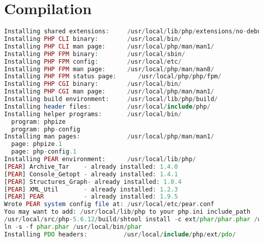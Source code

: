 \chapter{Compilation}

\begin{lstlisting}[language=PHP]
Installing shared extensions:     /usr/local/lib/php/extensions/no-debug-non-zts-20131226/
Installing PHP CLI binary:        /usr/local/bin/
Installing PHP CLI man page:      /usr/local/php/man/man1/
Installing PHP FPM binary:        /usr/local/sbin/
Installing PHP FPM config:        /usr/local/etc/
Installing PHP FPM man page:      /usr/local/php/man/man8/
Installing PHP FPM status page:      /usr/local/php/php/fpm/
Installing PHP CGI binary:        /usr/local/bin/
Installing PHP CGI man page:      /usr/local/php/man/man1/
Installing build environment:     /usr/local/lib/php/build/
Installing header files:          /usr/local/include/php/
Installing helper programs:       /usr/local/bin/
  program: phpize
  program: php-config
Installing man pages:             /usr/local/php/man/man1/
  page: phpize.1
  page: php-config.1
Installing PEAR environment:      /usr/local/lib/php/
[PEAR] Archive_Tar    - already installed: 1.4.0
[PEAR] Console_Getopt - already installed: 1.4.1
[PEAR] Structures_Graph- already installed: 1.0.4
[PEAR] XML_Util       - already installed: 1.2.3
[PEAR] PEAR           - already installed: 1.9.5
Wrote PEAR system config file at: /usr/local/etc/pear.conf
You may want to add: /usr/local/lib/php to your php.ini include_path
/usr/local/src/php-5.6.12/build/shtool install -c ext/phar/phar.phar /usr/local/bin
ln -s -f phar.phar /usr/local/bin/phar
Installing PDO headers:          /usr/local/include/php/ext/pdo/
\end{lstlisting}




\begin{lstlisting}[language=PHP]

\end{lstlisting}




\begin{lstlisting}[language=PHP]

\end{lstlisting}




\begin{lstlisting}[language=PHP]

\end{lstlisting}





